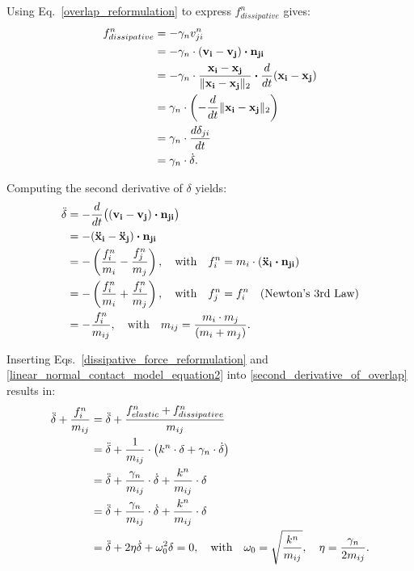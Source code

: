 \documentclass[11pt,
               a4paper,
               bibtotoc,
               idxtotoc,
               headsepline,
               footsepline,
               footexclude,
               BCOR12mm,
               DIV13,
               openany,   %
               ]
               {scrbook}
\begin{document}
Using Eq.~\ref{overlap_reformulation} to express \(f^n_{dissipative}\) gives:
\begin{align}
	f^n_{dissipative} &= -\gamma_n v^n_{ji} \notag \\
	&= -\gamma_n \cdot (\mathbf{v_i} - \mathbf{v_j}) \boldsymbol{\cdot} \mathbf{n_{ji}} \notag \\
	&= -\gamma_n \cdot \frac{\mathbf{x_i} - \mathbf{x_j}}{\lVert \mathbf{x_i} - \mathbf{x_j} \rVert_2} 
	\boldsymbol{\cdot} \frac{d}{dt}(\mathbf{x_i} - \mathbf{x_j}) \notag \\
	&= \gamma_n \cdot \left(-\frac{d}{dt} \lVert \mathbf{x_i} - \mathbf{x_j} \rVert_2\right) \notag \\
	&= \gamma_n \cdot \frac{d\delta_{ji}}{dt} \notag \\
	&= \gamma_n \cdot \dot{\delta}.
	\label{dissipative_force_reformulation}
\end{align}

Computing the second derivative of $\delta$ yields:
\begin{align}
	\ddot{\delta} &= -\frac{d}{dt}\big((\mathbf{v_i} - \mathbf{v_j}) \boldsymbol{\cdot} \mathbf{n_{ji}}\big) \notag \\
	&= -(\mathbf{\ddot{x}_i} - \mathbf{\ddot{x}_j}) \boldsymbol{\cdot} \mathbf{n_{ji}} \notag \\
	&= -\left(\frac{f^n_i}{m_i} - \frac{f^n_j}{m_j}\right), \quad \text{with} \quad 
	f^n_i = m_i \cdot (\mathbf{\ddot{x}_i} \boldsymbol{\cdot} \mathbf{n_{ji}}) \notag \\ 
	&= -\left(\frac{f^n_i}{m_i} + \frac{f^n_i}{m_j}\right), \quad \text{with} \quad 
	f^n_j = f^n_i \quad \text{(Newton's 3rd Law)} \notag \\
	&= -\frac{f^n_i}{m_{ij}}, \quad \text{with} \quad
	m_{ij} = \frac{m_i \cdot m_j}{(m_i + m_j)}.
	\label{second_derivative_of_overlap}
\end{align}

Inserting Eqs.~\ref{dissipative_force_reformulation} and \ref{linear_normal_contact_model_equation2} into \ref{second_derivative_of_overlap} results in:
\begin{align}
	\ddot{\delta} + \frac{f^n_i}{m_{ij}} &= \ddot{\delta} + \frac{f^n_{elastic} + f^n_{dissipative}}{m_{ij}} \notag \\
	&=  \ddot{\delta} + \frac{1}{m_{ij}} \cdot \left(k^n \cdot \delta + \gamma_n \cdot \dot{\delta}\right) \notag \\
	&= \ddot{\delta} + \frac{\gamma_n}{m_{ij}} \cdot \dot \delta + \frac{k^n}{m_{ij}} \cdot \delta \notag \\
	&= \ddot{\delta} + \frac{\gamma_n}{m_{ij}} \cdot \dot \delta + \frac{k^n}{m_{ij}} \cdot \delta \notag \\
	&= \ddot{\delta} + 2\eta\dot{\delta} + \omega_0^2\delta = 0, \quad \text{with} \quad \omega_0 = \sqrt{\frac{k^n}{m_{ij}}}, \quad \eta = \frac{\gamma_n}{2m_{ij}}.
\end{align}
\end{document}
